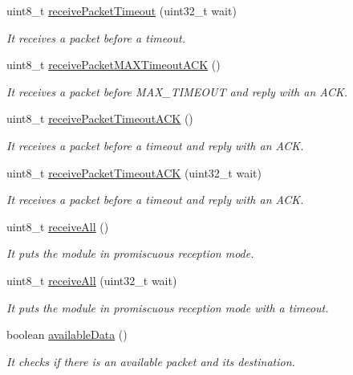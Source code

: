 \begin{DoxyCompactItemize}
uint8\+\_\+t \hyperlink{class_wasp_s_x1272_ab46cc22de51816249afea97045a65291}{receive\+Packet\+Timeout} (uint32\+\_\+t wait)
\begin{DoxyCompactList}\small\item\em It receives a packet before a timeout. \end{DoxyCompactList}\item 
uint8\+\_\+t \hyperlink{class_wasp_s_x1272_a3e138724ad6b6067c07b60bebf53431c}{receive\+Packet\+M\+A\+X\+Timeout\+A\+CK} ()
\begin{DoxyCompactList}\small\item\em It receives a packet before M\+A\+X\+\_\+\+T\+I\+M\+E\+O\+UT and reply with an A\+CK. \end{DoxyCompactList}\item 
uint8\+\_\+t \hyperlink{class_wasp_s_x1272_a4d10e4790879f549010178b97728772e}{receive\+Packet\+Timeout\+A\+CK} ()
\begin{DoxyCompactList}\small\item\em It receives a packet before a timeout and reply with an A\+CK. \end{DoxyCompactList}\item 
uint8\+\_\+t \hyperlink{class_wasp_s_x1272_a696bbccf8a987ff4b7a3881dbdc4692c}{receive\+Packet\+Timeout\+A\+CK} (uint32\+\_\+t wait)
\begin{DoxyCompactList}\small\item\em It receives a packet before a timeout and reply with an A\+CK. \end{DoxyCompactList}\item 
uint8\+\_\+t \hyperlink{class_wasp_s_x1272_a25d0016d01e66f8ee55b8cc2d32d6bf5}{receive\+All} ()
\begin{DoxyCompactList}\small\item\em It puts the module in \textquotesingle{}promiscuous\textquotesingle{} reception mode. \end{DoxyCompactList}\item 
uint8\+\_\+t \hyperlink{class_wasp_s_x1272_afec4215ab3837cd7ac92b9cfb6545706}{receive\+All} (uint32\+\_\+t wait)
\begin{DoxyCompactList}\small\item\em It puts the module in \textquotesingle{}promiscuous\textquotesingle{} reception mode with a timeout. \end{DoxyCompactList}\item 
boolean \hyperlink{class_wasp_s_x1272_ad3957a95fa55fd7731d7918582b86a53}{available\+Data} ()
\begin{DoxyCompactList}\small\item\em It checks if there is an available packet and its destination. \end{DoxyCompactList}\item 

\end{DoxyCompactItemize}
